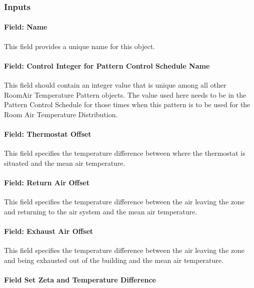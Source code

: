 \subsubsection{Inputs}\label{inputs-4-028}

\paragraph{Field: Name}\label{field-name-4-024}

This field provides a unique name for this object.

\paragraph{Field: Control Integer for Pattern Control Schedule Name}\label{field-control-integer-for-pattern-control-schedule-name-2}

This field should contain an integer value that is unique among all other RoomAir Temperature Pattern objects. The value used here needs to be in the Pattern Control Schedule for those times when this pattern is to be used for the Room Air Temperature Distribution.

\paragraph{Field: Thermostat Offset}\label{field-thermostat-offset-1}

This field specifies the temperature difference between where the thermostat is situated and the mean air temperature.

\paragraph{Field: Return Air Offset}\label{field-return-air-offset-1}

This field specifies the temperature difference between the air leaving the zone and returning to the air system and the mean air temperature.

\paragraph{Field: Exhaust Air Offset}\label{field-exhaust-air-offset-1}

This field specifies the temperature difference between the air leaving the zone and being exhausted out of the building and the mean air temperature.

\paragraph{Field Set Zeta and Temperature Difference}\label{field-set-zeta-and-temperature-difference}

